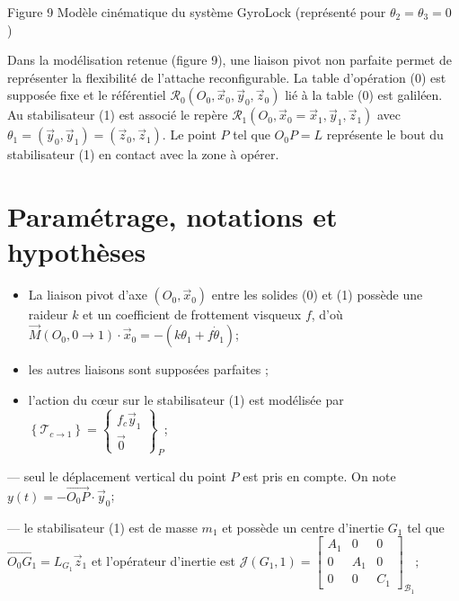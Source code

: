 Figure 9 Modèle cinématique du système GyroLock (représenté pour $\theta_{2}=\theta_{3}=0$ )

Dans la modélisation retenue (figure 9), une liaison pivot non parfaite permet de représenter la flexibilité de l'attache reconfigurable. La table d'opération (0) est supposée fixe et le référentiel $\mathcal{R}_{0}\left(O_{0}, \vec{x}_{0}, \vec{y}_{0}, \vec{z}_{0}\right)$ lié à la table (0) est galiléen. Au stabilisateur (1) est associé le repère $\mathcal{R}_{1}\left(O_{0}, \vec{x}_{0}=\vec{x}_{1}, \vec{y}_{1}, \vec{z}_{1}\right)$ avec $\theta_{1}=\left(\vec{y}_{0}, \vec{y}_{1}\right)=\left(\vec{z}_{0}, \vec{z}_{1}\right)$. Le point $P$ tel que $O_{0} P=L$ représente le bout du stabilisateur (1) en contact avec la zone à opérer.

\section{Paramétrage, notations et hypothèses}
\begin{itemize}
  \item La liaison pivot d'axe $\left(O_{0}, \vec{x}_{0}\right)$ entre les solides (0) et (1) possède une raideur $k$ et un coefficient de frottement visqueux $f$, d'où $\vec{M}\left(O_{0}, 0 \rightarrow 1\right) \cdot \vec{x}_{0}=-\left(k \theta_{1}+f \dot{\theta}_{1}\right)$;

  \item les autres liaisons sont supposées parfaites ;

  \item l'action du cœur sur le stabilisateur (1) est modélisée par $\left\{\mathcal{T}_{c \rightarrow 1}\right\}=\left\{\begin{array}{c}f_{c} \vec{y}_{1} \\ \overrightarrow{0}\end{array}\right\}_{P}$;

\end{itemize}

— seul le déplacement vertical du point $P$ est pris en compte. On note $y(t)=-\overrightarrow{O_{0} P} \cdot \vec{y}_{0}$;

— le stabilisateur (1) est de masse $m_{1}$ et possède un centre d'inertie $G_{1}$ tel que $\overrightarrow{O_{0} G_{1}}=L_{G_{1}} \vec{z}_{1}$ et l'opérateur d'inertie est $\mathcal{J}\left(G_{1}, 1\right)=\left[\begin{array}{ccc}A_{1} & 0 & 0 \\ 0 & A_{1} & 0 \\ 0 & 0 & C_{1}\end{array}\right]_{\mathcal{B}_{1}} ;$

